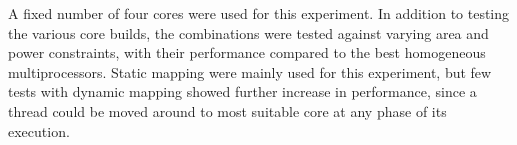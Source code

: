 

A fixed number of four cores were used for this experiment.
In addition to testing the various core builds, the combinations were tested against varying area and power constraints, with their performance compared to the best homogeneous multiprocessors.
Static mapping were mainly used for this experiment, but few tests with dynamic mapping showed further increase in performance, since a thread could be moved around to most suitable core at any phase of its execution. 



